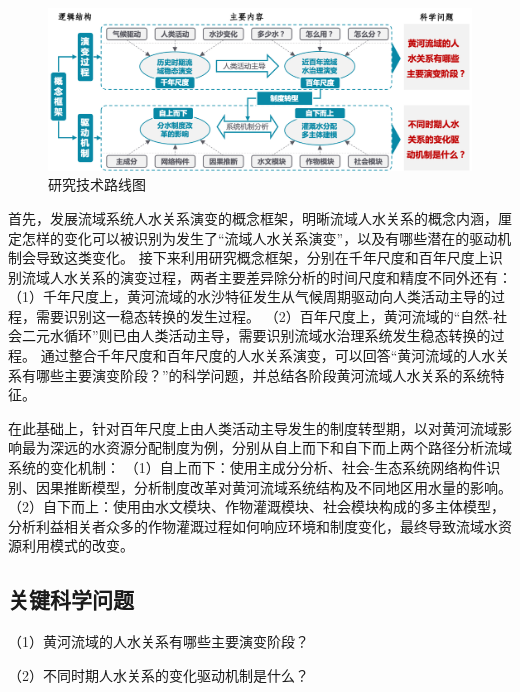 \begin{figure}[htb] %
    \includegraphics[width=\textwidth]{img/ch1/ch1_workflow.png}
    \caption{研究技术路线图}\label{ch1:fig:workflow}
\end{figure}

首先，发展流域系统人水关系演变的概念框架，明晰流域人水关系的概念内涵，厘定怎样的变化可以被识别为发生了“流域人水关系演变”，以及有哪些潜在的驱动机制会导致这类变化。
接下来利用研究概念框架，分别在千年尺度和百年尺度上识别流域人水关系的演变过程，两者主要差异除分析的时间尺度和精度不同外还有：
（1）千年尺度上，黄河流域的水沙特征发生从气候周期驱动向人类活动主导的过程，需要识别这一稳态转换的发生过程。
（2）百年尺度上，黄河流域的“自然-社会二元水循环”则已由人类活动主导，需要识别流域水治理系统发生稳态转换的过程。
通过整合千年尺度和百年尺度的人水关系演变，可以回答“黄河流域的人水关系有哪些主要演变阶段？”的科学问题，并总结各阶段黄河流域人水关系的系统特征。

在此基础上，针对百年尺度上由人类活动主导发生的制度转型期，以对黄河流域影响最为深远的水资源分配制度为例，分别从自上而下和自下而上两个路径分析流域系统的变化机制：
（1）自上而下：使用主成分分析、社会-生态系统网络构件识别、因果推断模型，分析制度改革对黄河流域系统结构及不同地区用水量的影响。
（2）自下而上：使用由水文模块、作物灌溉模块、社会模块构成的多主体模型，分析利益相关者众多的作物灌溉过程如何响应环境和制度变化，最终导致流域水资源利用模式的改变。

\subsection{关键科学问题}

（1）黄河流域的人水关系有哪些主要演变阶段？

（2）不同时期人水关系的变化驱动机制是什么？
